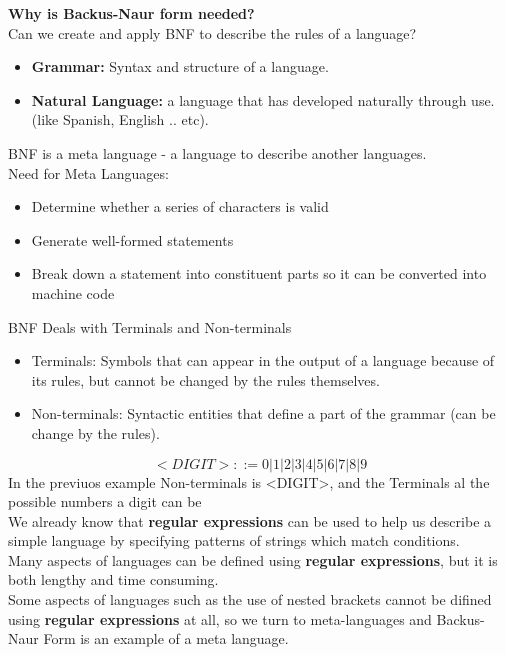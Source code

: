 \documentclass[
	12pt, %
]{fphw}
\begin{document}
\textbf{Why is Backus-Naur form needed?}\\

Can we create and apply BNF to describe the rules of a language?\\
\begin{itemize}
\item \textbf{Grammar:} Syntax and structure of a language.
\item \textbf{Natural Language:} a language that has developed naturally through use. (like Spanish, English .. etc).
\end{itemize}

BNF is a meta language - a language to describe another languages.\\
Need for Meta Languages:\\
\begin{itemize}
\item Determine whether a series of characters is valid
\item Generate well-formed statements
\item Break down a statement into constituent parts so it can be converted into machine code
\end{itemize}

BNF Deals with Terminals and Non-terminals
\begin{itemize}
\item Terminals: Symbols that can appear in the output of a language because of its rules, but cannot be changed by the rules themselves.
\item Non-terminals: Syntactic entities that define a part of the grammar (can be change by the rules).
\end{itemize}

\[<DIGIT>::= 0|1|2|3|4|5|6|7|8|9\]
In the previuos example Non-terminals is <DIGIT>, and the Terminals al the possible numbers a digit can be\\

We already know that \textbf{regular expressions} can be used to help us describe a simple language by specifying patterns of strings which match conditions.\\

Many aspects of languages can be defined using \textbf{regular expressions}, but it is both lengthy and time consuming.\\

Some aspects of languages such as the use of nested brackets cannot be difined using \textbf{regular expressions} at all, so we turn to meta-languages and Backus-Naur Form is an example of a meta language.
\end{document}
